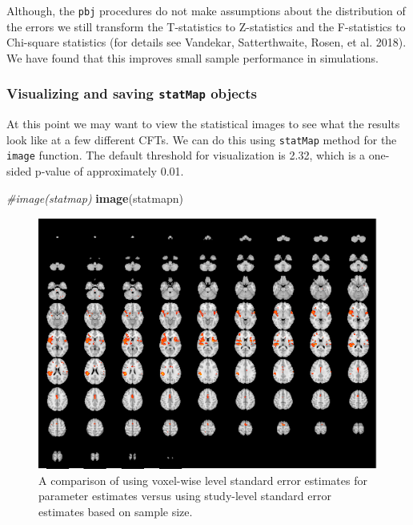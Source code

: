 \documentclass[]{article}
\newenvironment{Shaded}{\begin{snugshade}}{\end{snugshade}}
\newcommand{\CommentTok}[1]{\textcolor[rgb]{0.56,0.35,0.01}{\textit{#1}}}
\newcommand{\KeywordTok}[1]{\textcolor[rgb]{0.13,0.29,0.53}{\textbf{#1}}}
\newcommand{\NormalTok}[1]{#1}
\begin{document}
Although, the \texttt{pbj} procedures do not make assumptions about the
distribution of the errors we still transform the T-statistics to
Z-statistics and the F-statistics to Chi-square statistics (for details
see Vandekar, Satterthwaite, Rosen, et al. 2018). We have found that
this improves small sample performance in simulations.

\hypertarget{visualizing-and-saving-statmap-objects}{%
\subsubsection{\texorpdfstring{Visualizing and saving \texttt{statMap}
objects}{Visualizing and saving statMap objects}}\label{visualizing-and-saving-statmap-objects}}

At this point we may want to view the statistical images to see what the
results look like at a few different CFTs. We can do this using
\texttt{statMap} method for the \texttt{image} function. The default
threshold for visualization is 2.32, which is a one-sided p-value of
approximately 0.01.

\begin{Shaded}
\begin{Highlighting}[]
\CommentTok{#image(statmap)}
\KeywordTok{image}\NormalTok{(statmapn)}
\end{Highlighting}
\end{Shaded}

\begin{figure}
\centering
\includegraphics{introduction_to_pbj_files/figure-latex/unnamed-chunk-6-1.pdf}
\caption{A comparison of using voxel-wise level standard error estimates
for parameter estimates versus using study-level standard error
estimates based on sample size.}
\end{figure}
\end{document}
